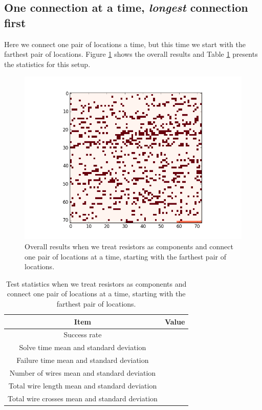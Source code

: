 \subsection{One connection at a time, \textit{longest} connection first}

Here we connect one pair of locations a time, but this time we start with the
farthest pair of locations. Figure \ref{fig:as_comp_pair_l} shows the overall
results and Table \ref{tb:as_comp_pair_l} presents the statistics for this
setup.

\begin{figure}[H]
\begin{center}
\includegraphics[width=\textwidth]{Images/overview_sample.png}
\caption{Overall results when we treat resistors as components and connect one
pair of locations at a time, starting with the farthest pair of locations.}
\label{fig:as_comp_pair_l}
\end{center}
\end{figure}

\begin{table}[H]
\begin{center}
\begin{singlespace}
\begin{tabular}{| c | c |}
\hline
Item & Value \\
\hline\hline
Success rate & \\
Solve time mean and standard deviation & \\
Failure time mean and standard deviation & \\
Number of wires mean and standard deviation & \\
Total wire length mean and standard deviation & \\
Total wire crosses mean and standard deviation & \\
\hline
\end{tabular}
\end{singlespace}
\end{center}
\label{tb:as_comp_pair_l}
\caption{Test statistics when we treat resistors as components and connect one
pair of locations at a time, starting with the farthest pair of locations.}
\end{table}

